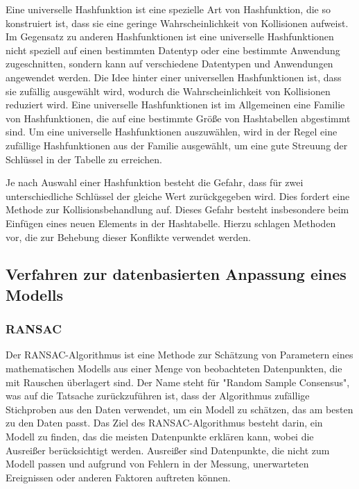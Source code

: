 Eine universelle Hashfunktion ist eine spezielle Art von Hashfunktion, die so konstruiert ist, dass sie eine geringe Wahrscheinlichkeit von Kollisionen aufweist. Im Gegensatz zu anderen Hashfunktionen ist eine universelle Hashfunktionen nicht speziell auf einen bestimmten Datentyp oder eine bestimmte Anwendung zugeschnitten, sondern kann auf verschiedene Datentypen und Anwendungen angewendet werden. Die Idee hinter einer universellen Hashfunktionen ist, dass sie zufällig ausgewählt wird, wodurch die Wahrscheinlichkeit von Kollisionen reduziert wird. Eine universelle Hashfunktionen ist im Allgemeinen eine Familie von Hashfunktionen, die auf eine bestimmte Größe von Hashtabellen abgestimmt sind. Um eine universelle Hashfunktionen auszuwählen, wird in der Regel eine zufällige Hashfunktionen aus der Familie ausgewählt, um eine gute Streuung der Schlüssel in der Tabelle zu erreichen. \autocite[232-234]{hubwieser_fundamente_2015} \autocite[114-116]{knebl_algorithmen_2021}

Je nach Auswahl einer Hashfunktion besteht die Gefahr, dass für zwei unterschiedliche Schlüssel der gleiche Wert zurückgegeben wird. Dies fordert eine Methode zur Kollisionsbehandlung auf. Dieses Gefahr besteht insbesondere beim Einfügen eines neuen Elements in der Hashtabelle. Hierzu schlagen \textcite[568-572]{ernst_grundkurs_2020} Methoden vor, die zur Behebung dieser Konflikte verwendet werden. 

\subsection{Verfahren zur datenbasierten Anpassung eines Modells}

\subsubsection{RANSAC}
Der RANSAC-Algorithmus ist eine Methode zur Schätzung von Parametern eines mathematischen Modells aus einer Menge von beobachteten Datenpunkten, die mit Rauschen überlagert sind. Der Name steht für "Random Sample Consensus", was auf die Tatsache zurückzuführen ist, dass der Algorithmus zufällige Stichproben aus den Daten verwendet, um ein Modell zu schätzen, das am besten zu den Daten passt. Das Ziel des RANSAC-Algorithmus besteht darin, ein Modell zu finden, das die meisten Datenpunkte erklären kann, wobei die Ausreißer berücksichtigt werden. Ausreißer sind Datenpunkte, die nicht zum Modell passen und aufgrund von Fehlern in der Messung, unerwarteten Ereignissen oder anderen Faktoren auftreten können. \autocite[381-383]{fischler_random_1981}

